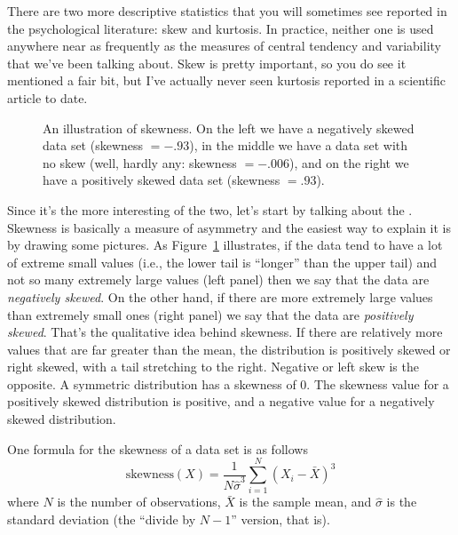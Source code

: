 There are two more descriptive statistics that you will sometimes see reported in the psychological literature: skew and kurtosis. In practice, neither one is used anywhere near as frequently as the measures of central tendency and variability that we've been talking about. Skew is pretty important, so you do see it mentioned a fair bit, but I've actually never seen kurtosis reported in a scientific article to date. 

\begin{figure}[ht]
\begin{center}
\caption{An illustration of skewness. On the left we have a negatively skewed data set (skewness $= -.93$), in the middle we have a data set with no skew (well, hardly any: skewness $= -.006$), and on the right we have a positively skewed data set (skewness $= .93$).  }
\label{fig:skewness}
\HR
\end{center}
\end{figure}

Since it's the more interesting of the two, let's start by talking about the . Skewness is basically a measure of asymmetry and the easiest way to explain it is by drawing some pictures. As Figure~\ref{fig:skewness} illustrates, if the data tend to have a lot of extreme small values (i.e., the lower tail is ``longer'' than the upper tail) and not so many extremely large values (left panel) then we say that the data are {\it negatively skewed}. On the other hand, if there are more extremely large values than extremely small ones (right panel) we say that the data are {\it positively skewed}. That's the qualitative idea behind skewness. If there are relatively more values that are far greater than the mean, the distribution is positively skewed or right skewed, with a tail stretching to the right.  Negative or left skew is the opposite. A symmetric distribution has a skewness of 0.  The skewness value for a positively skewed distribution is positive, and a negative value for a negatively skewed distribution. 

\vspace{0.5cm}
\begin{mdframed}[style=MyFrame,nobreak=true]
One formula for the skewness of a data set is as follows
$$
\mbox{skewness}(X) = \frac{1}{N \hat{\sigma}^3} \sum_{i=1}^N (X_i - \bar{X})^3
$$
where $N$ is the number of observations, $\bar{X}$ is the sample mean, and $\hat{\sigma}$ is the standard deviation (the ``divide by $N-1$'' version, that is). 
\end{mdframed}

